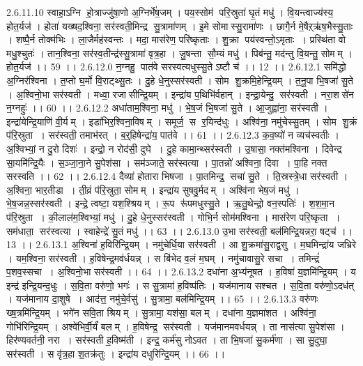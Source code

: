 2.6.11.10
स्वाहा॒ऽग्नि हो॒त्राज्जु॑षा॒णो अ॒ग्निर्भे॑ष॒जम् । पय॒स्सोम॑ परि॒स्रुता॑ घृ॒तं मधु॑ । वि॒यन्त्वाज्य॑स्य॒ होत॒र्यज॑ । होता॑ यख्षद॒श्विना॒ सर॑स्वती॒मिन्द्र॑ सु॒त्रामा॑णम् । इ॒मे सोमास्सु॒रामा॑णः । छागै॒र्न मे॒षैऱ्ऋ॑ष॒भैस्सु॒ताः । शष्पै॒र्न तोक्म॑भिः । ला॒जैर्मह॑स्वन्तः । मदा॒ मास॑रेण॒ परि॑ष्कृताः । शु॒क्रा पय॑स्वन्तो॒ऽमृताः । प्रस्थि॑ता वो मधु॒श्चुतः॑ । तान॒श्विना॒ सर॑स्व॒तीन्द्र॑स्सु॒त्रामा॑ वृत्र॒हा । जु॒षन्ता॑ सौ॒म्यं मधु॑ । पिब॑न्तु॒ मद॑न्तु वि॒यन्तु॒ सोमम् । होत॒र्यज॑ ।। 59 ।।
2.6.12.0
न॒ग्नहु॒ पात॑वे सरस्वत्यधुस्सु॒तेऽष्टौ च॑ ।। 12 ।।
2.6.12.1
समि॑द्धो अ॒ग्निर॑श्विना । त॒प्तो घ॒र्मो वि॒राट्थ्सु॒तः । दु॒हे धे॒नुस्सर॑स्वती । सोम॑ शु॒क्रमि॒हेन्द्रि॒यम् । त॒नू॒पा भि॒षजा॑ सु॒ते । अ॒श्विनो॒भा सर॑स्वती । मध्वा॒ रजा॑सीन्द्रि॒यम् । इन्द्रा॑य प॒थिभि॑र्वहान् । इन्द्रा॒येन्दु॒॒ सर॑स्वती । नरा॒शसे॑न न॒ग्नहुः॑ ।। 60 ।।
2.6.12.2
अधा॑ताम॒श्विना॒ मधु॑ । भे॒ष॒जं भि॒षजा॑ सु॒ते । आ॒जुह्वा॑ना॒ सर॑स्वती । इन्द्रा॑येन्द्रि॒याणि॑ वी॒र्यम् । इडा॑भिर॒श्विना॒विषम् । समूर्ज॒ स र॒यिन्द॑धुः । अश्वि॑ना॒ नमु॑चेस्सु॒तम् । सोम॑ शु॒क्रं प॑रि॒स्रुता । सर॑स्वती॒ तमाभ॑रत् । ब॒र्॒हिषेन्द्रा॑य॒ पात॑वे ।। 61 ।।
2.6.12.3
क॒व॒ष्यो॑ न व्यच॑स्वतीः । अ॒श्विभ्यां॒ न दु॒रो दिशः॑ । इन्द्रो॒ न रोद॑सी॒ दुघे । दु॒हे कामा॒न्थ्सर॑स्वती । उ॒षासा॒ नक्त॑मश्विना । दिवेन्द्र॑ सा॒यमि॑न्द्रि॒यैः । स॒ञ्जा॒ना॒ने सु॒पेश॑सा । सम॑ञ्जाते॒ सर॑स्वत्या । पा॒तन्नो॑ अश्विना॒ दिवा । पा॒हि नक्त॑ सरस्वति ।। 62 ।।
2.6.12.4
दैव्या॑ होतारा भिषजा । पा॒तमिन्द्र॒॒ सचा॑ सु॒ते । ति॒स्रस्त्रे॒धा सर॑स्वती । अ॒श्विना॒ भार॒तीडा । ती॒व्रं प॑रि॒स्रुता॒ सोमम् । इन्द्रा॑य सुषवु॒र्मदम् । अश्वि॑ना भेष॒जं मधु॑ । भे॒ष॒जन्न॒स्सर॑स्वती । इन्द्रे॒ त्वष्टा॒ यश॒श्श्रियम् । रू॒प रू॑पमधुस्सु॒ते । ऋ॒तु॒थेन्द्रो॒ वन॒स्पतिः॑ । श॒श॒मा॒न प॑रि॒स्रुता । की॒लाल॑म॒श्विभ्यां॒ मधु॑ । दु॒हे धे॒नुस्सर॑स्वती । गोभि॒र्न सोम॑मश्विना । मास॑रेण परि॒ष्कृता । सम॑धाता॒॒ सर॑स्वत्या । स्वाहेन्द्रे॑ सु॒तं मधु॑ ।। 63 ।।
2.6.13.0
उ॒भा सर॑स्वती॒ बल॑मिन्द्रि॒यन्नरा॒ षट्च॑ ।। 13 ।।
2.6.13.1
अ॒श्विना॑ ह॒विरि॑न्द्रि॒यम् । नमु॑चेर्धि॒या सर॑स्वती । आ शु॒क्रमा॑सु॒राद्व॒सु । म॒घमिन्द्रा॑य जभ्रिरे । यम॒श्विना॒ सर॑स्वती । ह॒विषेन्द्र॒मव॑र्धयन्न् । स बि॑भेद व॒लं म॒घम् । नमु॑चावासु॒रे सचा । तमिन्द्रं॑ प॒शव॒स्सचा । अ॒श्विनो॒भा सर॑स्वती ।। 64 ।।
2.6.13.2
दधा॑ना अ॒भ्य॑नूषत । ह॒विषा॑ य॒ज्ञमि॑न्द्रि॒यम् । य इन्द्र॑ इन्द्रि॒यन्द॒धुः । स॒वि॒ता वरु॑णो॒ भगः॑ । स सु॒त्रामा॑ ह॒विष्प॑तिः । यज॑मानाय सश्चत । स॒वि॒ता वरु॑णो॒ऽदध॑त् । यज॑मानाय दा॒शुषे । आद॑त्त॒ नमु॑चे॒र्वसु॑ । सु॒त्रामा॒ बल॑मिन्द्रि॒यम् ।। 65 ।।
2.6.13.3
वरु॑णः ख्ष॒त्रमि॑न्द्रि॒यम् । भगे॑न सवि॒ता श्रियम् । सु॒त्रामा॒ यश॑सा॒ बलम् । दधा॑ना य॒ज्ञमा॑शत । अश्वि॑ना॒ गोभि॑रिन्द्रि॒यम् । अश्वे॑भिर्वी॒र्यं॑ बलम् । ह॒विषेन्द्र॒॒ सर॑स्वती । यज॑मानमवर्धयन्न् । ता नास॑त्या सु॒पेश॑सा । हिर॑ण्यवर्तनी॒ नरा । सर॑स्वती ह॒विष्म॑ती । इन्द्र॒ कर्म॑सु नोऽवत । ता भि॒षजा॑ सु॒कर्म॑णा । सा सु॒दुघा॒ सर॑स्वती । स वृ॑त्र॒हा श॒तक्र॑तुः । इन्द्रा॑य दधुरिन्द्रि॒यम् ।। 66 ।।
